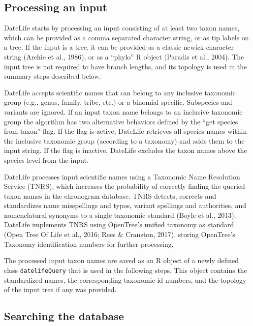 \documentclass[
  english,
  man]{apa6}
\begin{document}
\hypertarget{processing-an-input}{%
\subsection{Processing an input}\label{processing-an-input}}

DateLife starts by processing an input consisting of at least two taxon names, which can be provided as a comma separated character string, or as tip labels on a tree. If the input is a tree, it can be provided as a classic newick character string (Archie et al., 1986), or as a ``phylo'' R object (Paradis et al., 2004). The input tree is not required to have branch lengths, and its topology is used in the summary steps described below.

DateLife accepts scientific names that can belong to any inclusive taxonomic group (e.g., genus, family, tribe, etc.) or a binomial specific. Subspecies and variants are ignored. If an input taxon name belongs to an inclusive taxonomic group the algorithm has two alternative behaviors defined by the ``get species from taxon'' flag. If the flag is active, DateLife retrieves all species names within the inclusive taxonomic group (according to a taxonomy) and adds them to the input string. If the flag is inactive, DateLife excludes the taxon names above the species level from the input.

DateLife processes input scientific names using a Taxonomic Name Resolution Service (TNRS), which increases the probability of correctly finding the queried taxon names in the chronogram database. TNRS detects, corrects and standardizes name misspellings and typos, variant spellings and authorities, and nomenclatural synonyms to a single taxonomic standard (Boyle et al., 2013). DateLife implements TNRS using OpenTree's unified taxonomy as standard (Open Tree Of Life et al., 2016; Rees \& Cranston, 2017), storing OpenTree's Taxonomy identification numbers for further processing.

The processed input taxon names are saved as an R object of a newly defined class \texttt{datelifeQuery} that is used in the following steps. This object contains the standardized names, the corresponding taxonomic id numbers, and the topology of the input tree if any was provided.

\hypertarget{searching-the-database}{%
\subsection{Searching the database}\label{searching-the-database}}
\end{document}
